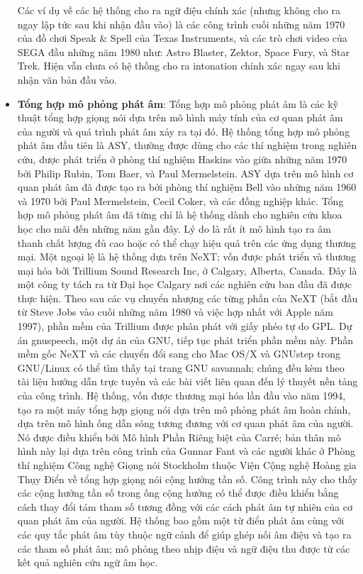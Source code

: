 \begin{itemize}
Các ví dụ về các hệ thống cho ra ngữ điệu chính xác (nhưng không cho ra ngay lập tức sau khi nhận đầu vào) là các công trình cuối những năm 1970 của đồ chơi Speak \& Spell của Texas Instruments, và các trò chơi video của SEGA đầu những năm 1980 như: Astro Blaster, Zektor, Space Fury, và Star Trek. Hiện vẫn chưa có hệ thống cho ra intonation chính xác ngay sau khi nhận văn bản đầu vào.

\item \textbf{Tổng hợp mô phỏng phát âm}: Tổng hợp mô phỏng phát âm là các kỹ thuật tổng hợp giọng nói dựa trên mô hình máy tính của cơ quan phát âm của người và quá trình phát âm xảy ra tại đó. Hệ thống tổng hợp mô phỏng phát âm đầu tiên là ASY, thường được dùng cho các thí nghiệm trong nghiên cứu, được phát triển ở phòng thí nghiệm Haskins vào giữa những năm 1970 bởi Philip Rubin, Tom Baer, và Paul Mermelstein. ASY dựa trên mô hình cơ quan phát âm đã được tạo ra bởi phòng thí nghiệm Bell vào những năm 1960 và 1970 bởi Paul Mermelstein, Cecil Coker, và các đồng nghiệp khác. Tổng hợp mô phỏng phát âm đã từng chỉ là hệ thống dành cho nghiên cứu khoa học cho mãi đến những năm gần đây. Lý do là rất ít mô hình tạo ra âm thanh chất lượng đủ cao hoặc có thể chạy hiệu quả trên các ứng dụng thương mại. Một ngoại lệ là hệ thống dựa trên NeXT; vốn được phát triển và thương mại hóa bởi Trillium Sound Research Inc, ở Calgary, Alberta, Canada. Đây là một công ty tách ra từ Đại học Calgary nơi các nghiên cứu ban đầu đã được thực hiện. Theo sau các vụ chuyển nhượng các từng phần của NeXT (bắt đầu từ Steve Jobs vào cuối những năm 1980 và việc hợp nhất với Apple năm 1997), phần mềm của Trillium được phân phát với giấy phéo tự do GPL. Dự án gnuspeech, một dự án của GNU, tiếp tục phát triển phần mềm này. Phần mềm gốc NeXT và các chuyển đổi sang cho Mac OS/X và GNUstep trong GNU/Linux có thể tìm thấy tại trang GNU savannah; chúng đều kèm theo tài liệu hướng dẫn trực tuyến và các bài viết liên quan đến lý thuyết nền tảng của công trình. Hệ thống, vốn được thương mại hóa lần đầu vào năm 1994, tạo ra một máy tổng hợp giọng nói dựa trên mô phỏng phát âm hoàn chỉnh, dựa trên mô hình ống dẫn sóng tương đương với cơ quan phát âm của người. Nó được điều khiển bởi Mô hình Phần Riêng biệt của Carré; bản thân mô hình này lại dựa trên công trình của Gunnar Fant và các người khác ở Phòng thí nghiệm Công nghệ Giọng nói Stockholm thuộc Viện Cộng nghệ Hoàng gia Thụy Điển về tổng hợp giọng nói cộng hưởng tần số. Công trình này cho thấy các cộng hưởng tần số trong ống cộng hưởng có thể được điều khiển bằng cách thay đổi tám tham số tương đồng với các cách phát âm tự nhiên của cơ quan phát âm của người. Hệ thống bao gồm một từ điển phát âm cùng với các quy tắc phát âm tùy thuộc ngữ cảnh để giúp ghép nối âm điệu và tạo ra các tham số phát âm; mô phỏng theo nhịp điệu và ngữ điệu thu được từ các kết quả nghiên cứu ngữ âm học.


\end{itemize}
